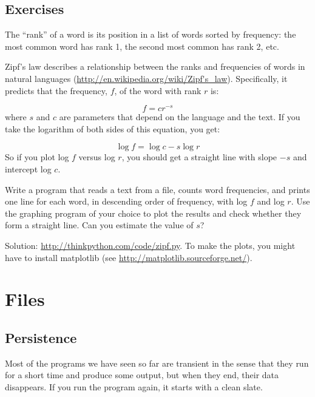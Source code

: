 \documentclass[10pt]{book}
\begin{document}
\begin{CJK}{UTF8}{gbsn}
\section{Exercises}

\begin{exercise}

The ``rank'' of a word is its position in a list of words
sorted by frequency: the most common word has rank 1, the
second most common has rank 2, etc.

Zipf's law describes a relationship between the ranks and frequencies
of words in natural languages
(\url{http://en.wikipedia.org/wiki/Zipf's_law}).  Specifically, it
predicts that the frequency, $f$, of the word with rank $r$ is:

\[ f = c r^{-s} \]
%
where $s$ and $c$ are parameters that depend on the language and the
text.  If you take the logarithm of both sides of this equation, you
get:

\[ \log f = \log c - s \log r \]
%
So if you plot log $f$ versus log $r$, you should get
a straight line with slope $-s$ and intercept log $c$.

Write a program that reads a text from a file, counts
word frequencies, and prints one line
for each word, in descending order of frequency, with
log $f$ and log $r$.  Use the graphing program of your
choice to plot the results and check whether they form
a straight line.  Can you estimate the value of $s$?

Solution: \url{http://thinkpython.com/code/zipf.py}.  To make the plots, you
might have to install matplotlib (see
\url{http://matplotlib.sourceforge.net/}).

\end{exercise}


\chapter{Files}


\section{Persistence}

Most of the programs we have seen so far are transient in the
sense that they run for a short time and produce some output,
but when they end, their data disappears.  If you run the program
again, it starts with a clean slate.


\end{CJK}
\end{document}
